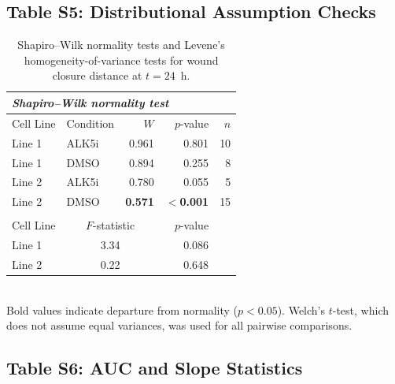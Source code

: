 \subsection*{Table S5: Distributional Assumption Checks}

\begin{table}[H]
  \centering
  \caption{Shapiro--Wilk normality tests and Levene's homogeneity-of-variance tests for wound closure distance at $t = 24$~h.}\label{tab:assumptions}
  \begin{tabular}{llrrr}
    \toprule
    \multicolumn{5}{l}{\textit{Shapiro--Wilk normality test}} \\
    \midrule
    Cell Line & Condition & $W$ & $p$-value & $n$ \\
    \midrule
    Line 1 & ALK5i & 0.961 & 0.801 & 10 \\
    Line 1 & DMSO  & 0.894 & 0.255 & 8 \\
    Line 2 & ALK5i & 0.780 & 0.055 & 5 \\
    Line 2 & DMSO  & \textbf{0.571} & $<$\textbf{0.001} & 15 \\
    \addlinespace
    \multicolumn{5}{l}{\textit{Levene's test for homogeneity of variances}} \\
    \midrule
    Cell Line & \multicolumn{2}{c}{$F$-statistic} & $p$-value & \\
    \midrule
    Line 1 & \multicolumn{2}{c}{3.34} & 0.086 & \\
    Line 2 & \multicolumn{2}{c}{0.22} & 0.648 & \\
    \bottomrule
  \end{tabular}
  \smallskip\\
  {\small Bold values indicate departure from normality ($p < 0.05$). Welch's $t$-test, which does not assume equal variances, was used for all pairwise comparisons.}
\end{table}

\subsection*{Table S6: AUC and Slope Statistics}

